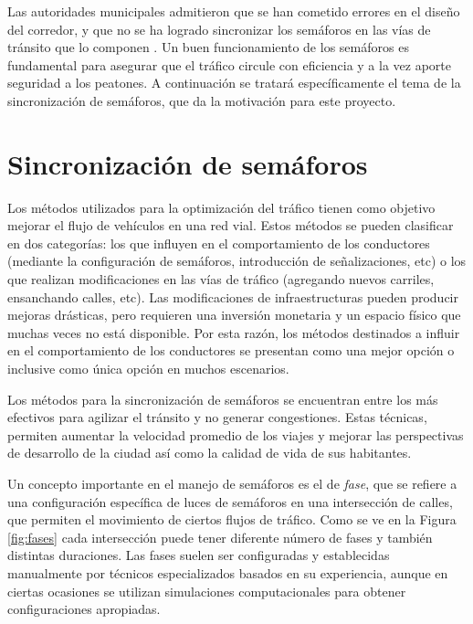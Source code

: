 Las autoridades municipales admitieron que se han cometido errores en el diseño del corredor, y que no se ha logrado sincronizar los semáforos en las vías de tránsito que lo componen \citep{olivera2013}. Un buen funcionamiento de los semáforos es fundamental para asegurar que el tráfico circule con eficiencia y a la vez aporte seguridad a los peatones. A continuación se tratará específicamente el tema de la sincronización de semáforos, que da la motivación para este proyecto. 


\section{Sincronización de semáforos}
Los métodos utilizados para la optimización del tráfico tienen como objetivo mejorar el flujo de vehículos en una red vial. Estos métodos se pueden clasificar en dos categorías: los que influyen en el comportamiento de los conductores (mediante la configuración de semáforos, introducción de señalizaciones, etc) o los que realizan modificaciones en las vías de tráfico (agregando nuevos carriles, ensanchando calles, etc). Las modificaciones de infraestructuras pueden producir mejoras drásticas, pero requieren una inversión monetaria y un espacio físico que muchas veces no está disponible. Por esta razón, los métodos destinados a influir en el comportamiento de los conductores se presentan como una mejor opción o inclusive como única opción en muchos escenarios.

Los métodos para la sincronización de semáforos se encuentran entre los más efectivos para agilizar el tránsito y no generar congestiones. Estas técnicas, permiten aumentar la velocidad promedio de los viajes y mejorar las perspectivas de desarrollo de la ciudad así como la calidad de vida de sus habitantes. 

Un concepto importante en el manejo de semáforos es el de \emph{fase}, que se refiere a una configuración específica de luces de semáforos en una intersección de calles, que permiten el movimiento de ciertos flujos de tráfico. Como se ve en la Figura \ref{fig:fases} cada intersección puede tener diferente número de fases y también distintas duraciones. Las fases suelen ser configuradas y establecidas manualmente por técnicos especializados basados en su experiencia, aunque en ciertas ocasiones se utilizan simulaciones computacionales para obtener configuraciones apropiadas. 

